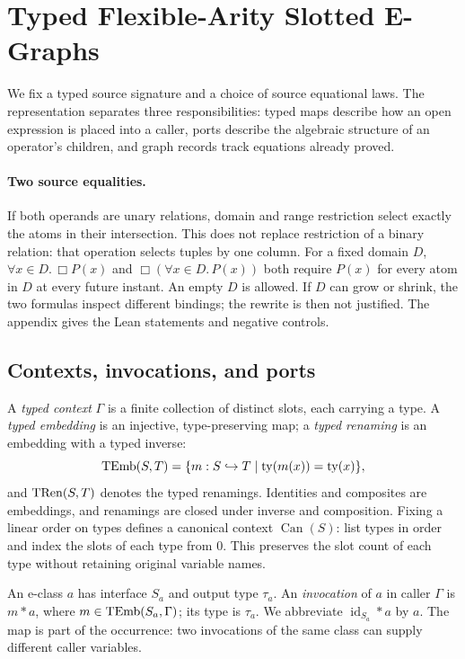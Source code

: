 \section{Typed Flexible-Arity Slotted E-Graphs}
\label{sec:formalism}

We fix a typed source signature and a choice of source equational laws. The
representation separates three responsibilities: typed maps describe how an open
expression is placed into a caller, ports describe the algebraic structure of
an operator's children, and graph records track equations already proved.

\paragraph{Two source equalities.}
If both operands are unary relations, domain and range restriction select
exactly the atoms in their intersection. This does not replace restriction
of a binary relation: that operation selects tuples by one column.
For a fixed domain $D$, $\forall x\in D.\,\Box P(x)$ and
$\Box(\forall x\in D.\,P(x))$ both require $P(x)$ for every atom in $D$
at every future instant. An empty $D$ is allowed. If $D$ can grow or
shrink, the two formulas inspect different bindings; the rewrite is then
not justified. The appendix gives the Lean statements and negative controls.

\subsection{Contexts, invocations, and ports}

A \emph{typed context} $\Gamma$ is a finite collection of distinct slots, each
carrying a type. A \emph{typed embedding} is an injective, type-preserving map;
a \emph{typed renaming} is an embedding with a typed inverse:
\[
 \operatorname{TEmb}(S,T)=\{m:S\hookrightarrow T\mid
                    \operatorname{ty}(m(x))=\operatorname{ty}(x)\},
\]
and $\operatorname{TRen}(S,T)$ denotes the typed renamings. Identities and composites are
embeddings, and renamings are closed under inverse and composition. Fixing a
linear order on types defines a canonical context $\operatorname{Can}(S)$: list
types in order and index the slots of each type from $0$. This preserves the
slot count of each type without retaining original variable names.

An e-class $a$ has interface $S_a$ and output type $\tau_a$. An
\emph{invocation} of $a$ in caller $\Gamma$ is $m*a$, where
$m\in\operatorname{TEmb}(S_a,\Gamma)$; its type is $\tau_a$. We abbreviate
$\operatorname{id}_{S_a}*a$ by $a$. The map is part of the occurrence: two
invocations of the same class can supply different caller variables.

